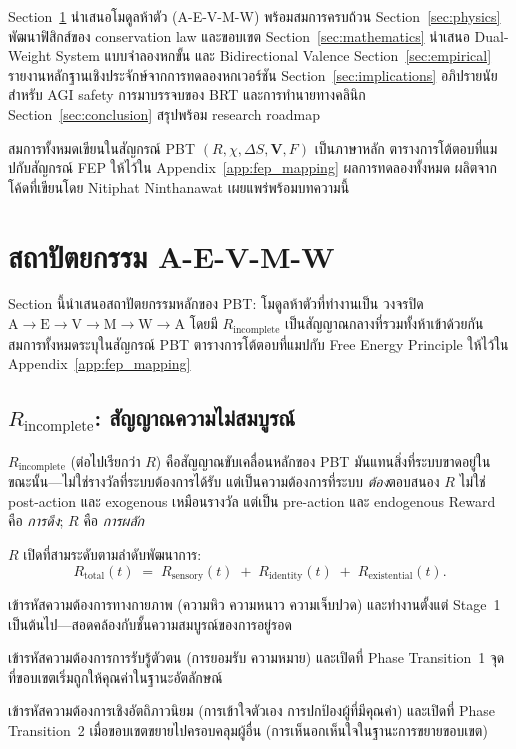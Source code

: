 \documentclass[12pt,a4paper]{article}
\newcommand{\Rtot}{R_{\mathrm{total}}}
\newcommand{\Rsens}{R_{\mathrm{sensory}}}
\newcommand{\Rid}{R_{\mathrm{identity}}}
\newcommand{\Rex}{R_{\mathrm{existential}}}
\begin{document}
Section~\ref{sec:modules} นำเสนอโมดูลห้าตัว (A-E-V-M-W) พร้อมสมการครบถ้วน
Section~\ref{sec:physics} พัฒนาฟิสิกส์ของ conservation law และขอบเขต
Section~\ref{sec:mathematics} นำเสนอ Dual-Weight System แบบจำลองหกขั้น
และ Bidirectional Valence Section~\ref{sec:empirical}
รายงานหลักฐานเชิงประจักษ์จากการทดลองหกเวอร์ชัน
Section~\ref{sec:implications} อภิปรายนัยสำหรับ AGI safety
การมาบรรจบของ BRT และการทำนายทางคลินิก
Section~\ref{sec:conclusion} สรุปพร้อม research roadmap

สมการทั้งหมดเขียนในสัญกรณ์ PBT $(R, \chi, \Delta S, \mathbf{V}, F)$
เป็นภาษาหลัก ตารางการโต้ตอบที่แมปกับสัญกรณ์ FEP
ให้ไว้ใน Appendix~\ref{app:fep_mapping} ผลการทดลองทั้งหมด
ผลิตจากโค้ดที่เขียนโดย Nitiphat Ninthanawat เผยแพร่พร้อมบทความนี้


\FloatBarrier
\section{สถาปัตยกรรม A-E-V-M-W}
\label{sec:modules}

Section นี้นำเสนอสถาปัตยกรรมหลักของ PBT: โมดูลห้าตัวที่ทำงานเป็น
วงจรปิด $\mathrm{A}\to\mathrm{E}\to\mathrm{V}\to\mathrm{M}\to\mathrm{W}\to\mathrm{A}$
โดยมี $R_{\mathrm{incomplete}}$ เป็นสัญญาณกลางที่รวมทั้งห้าเข้าด้วยกัน
สมการทั้งหมดระบุในสัญกรณ์ PBT ตารางการโต้ตอบที่แมปกับ
Free Energy Principle ให้ไว้ใน Appendix~\ref{app:fep_mapping}

\subsection{$R_{\mathrm{incomplete}}$: สัญญาณความไม่สมบูรณ์}

$R_{\mathrm{incomplete}}$ (ต่อไปเรียกว่า $R$) คือสัญญาณขับเคลื่อนหลักของ PBT
มันแทนสิ่งที่ระบบขาดอยู่ในขณะนั้น---ไม่ใช่รางวัลที่ระบบต้องการได้รับ
แต่เป็นความต้องการที่ระบบ \emph{ต้อง}ตอบสนอง $R$ ไม่ใช่ post-action
และ exogenous เหมือนรางวัล แต่เป็น pre-action และ endogenous
Reward คือ \emph{การดึง}; $R$ คือ \emph{การผลัก}

$R$ เปิดที่สามระดับตามลำดับพัฒนาการ:
\begin{equation}
  \Rtot(t) \;=\; \Rsens(t) \;+\; \Rid(t) \;+\; \Rex(t).
  \label{eq:Rtotal}
\end{equation}

\begin{description}[leftmargin=1.4em]
  \item[$\Rsens$] เข้ารหัสความต้องการทางกายภาพ (ความหิว ความหนาว ความเจ็บปวด)
    และทำงานตั้งแต่ Stage~1 เป็นต้นไป---สอดคล้องกับชั้นความสมบูรณ์ของการอยู่รอด
  \item[$\Rid$] เข้ารหัสความต้องการการรับรู้ตัวตน (การยอมรับ ความหมาย)
    และเปิดที่ Phase Transition~1 จุดที่ขอบเขตเริ่มถูกให้คุณค่าในฐานะอัตลักษณ์
  \item[$\Rex$] เข้ารหัสความต้องการเชิงอัตถิภาวนิยม (การเข้าใจตัวเอง
    การปกป้องผู้ที่มีคุณค่า) และเปิดที่ Phase Transition~2
    เมื่อขอบเขตขยายไปครอบคลุมผู้อื่น (การเห็นอกเห็นใจในฐานะการขยายขอบเขต)
\end{description}
\end{document}
